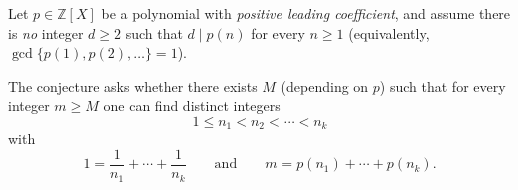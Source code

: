 Let $p\in\mathbb{Z}[X]$ be a polynomial with \emph{positive leading coefficient}, and assume there is \emph{no} integer $d\ge 2$ such that $d\mid p(n)$ for every $n\ge 1$ (equivalently, $\gcd\{p(1),p(2),\dots\}=1$).

The conjecture asks whether there exists $M$ (depending on $p$) such that for every integer $m\ge M$ one can find distinct integers
\[
1\le n_1<n_2<\cdots<n_k
\]
with
\[
1=\frac1{n_1}+\cdots+\frac1{n_k}
\qquad\text{and}\qquad
m=p(n_1)+\cdots+p(n_k).
\]
